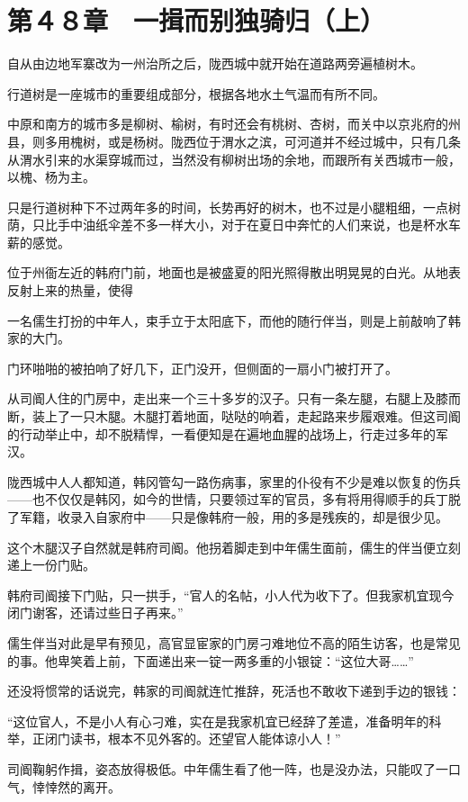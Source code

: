 \section{第４８章　一揖而别独骑归（上）}

自从由边地军寨改为一州治所之后，陇西城中就开始在道路两旁遍植树木。

行道树是一座城市的重要组成部分，根据各地水土气温而有所不同。

中原和南方的城市多是柳树、榆树，有时还会有桃树、杏树，而关中以京兆府的州县，则多用槐树，或是杨树。陇西位于渭水之滨，可河道并不经过城中，只有几条从渭水引来的水渠穿城而过，当然没有柳树出场的余地，而跟所有关西城市一般，以槐、杨为主。

只是行道树种下不过两年多的时间，长势再好的树木，也不过是小腿粗细，一点树荫，只比手中油纸伞差不多一样大小，对于在夏日中奔忙的人们来说，也是杯水车薪的感觉。

位于州衙左近的韩府门前，地面也是被盛夏的阳光照得散出明晃晃的白光。从地表反射上来的热量，使得

一名儒生打扮的中年人，束手立于太阳底下，而他的随行伴当，则是上前敲响了韩家的大门。

门环啪啪的被拍响了好几下，正门没开，但侧面的一扇小门被打开了。

从司阍人住的门房中，走出来一个三十多岁的汉子。只有一条左腿，右腿上及膝而断，装上了一只木腿。木腿打着地面，哒哒的响着，走起路来步履艰难。但这司阍的行动举止中，却不脱精悍，一看便知是在遍地血腥的战场上，行走过多年的军汉。

陇西城中人人都知道，韩冈管勾一路伤病事，家里的仆役有不少是难以恢复的伤兵——也不仅仅是韩冈，如今的世情，只要领过军的官员，多有将用得顺手的兵丁脱了军籍，收录入自家府中——只是像韩府一般，用的多是残疾的，却是很少见。

这个木腿汉子自然就是韩府司阍。他拐着脚走到中年儒生面前，儒生的伴当便立刻递上一份门贴。

韩府司阍接下门贴，只一拱手，“官人的名帖，小人代为收下了。但我家机宜现今闭门谢客，还请过些日子再来。”

儒生伴当对此是早有预见，高官显宦家的门房刁难地位不高的陌生访客，也是常见的事。他卑笑着上前，下面递出来一锭一两多重的小银锭：“这位大哥……”

还没将惯常的话说完，韩家的司阍就连忙推辞，死活也不敢收下递到手边的银钱：

“这位官人，不是小人有心刁难，实在是我家机宜已经辞了差遣，准备明年的科举，正闭门读书，根本不见外客的。还望官人能体谅小人！”

司阍鞠躬作揖，姿态放得极低。中年儒生看了他一阵，也是没办法，只能叹了一口气，悻悻然的离开。


